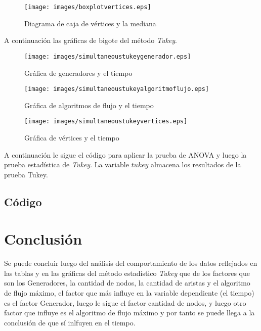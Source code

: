 \documentclass{article}
\begin{document}
\begin{figure}[H] 
    \centering
        \texttt{[image: images/boxplotvertices.eps]}
\caption{Diagrama de caja de vértices y la mediana}
\label{fig:seq1}
\end{figure}

A continuación las gráficas de bigote del método \textit{Tukey}.

\begin{figure}[H] 
    \centering
        \texttt{[image: images/simultaneoustukeygenerador.eps]}
\caption{Gráfica de generadores y el tiempo}
\label{fig:seq1}
\end{figure} 

\begin{figure}[H] 
    \centering
        \texttt{[image: images/simultaneoustukeyalgoritmoflujo.eps]}
\caption{Gráfica de algoritmos de flujo y el tiempo}
\label{fig:seq1}
\end{figure} 

\begin{figure}[H] 
    \centering
        \texttt{[image: images/simultaneoustukeyvertices.eps]}
\caption{Gráfica de vértices y el tiempo}
\label{fig:seq1}
\end{figure} 

A continuación le sigue el código para aplicar la prueba de ANOVA y luego la prueba estadística de \textit{Tukey}. La variable $tukey$ almacena los resultados de la prueba Tukey. 

\subsection{Código}



\section{Conclusión}

Se puede concluir luego del análisis del comportamiento de los datos reflejados en las tablas y en las gráficas del método estadístico \textit{Tukey} que de los factores que son los Generadores, la cantidad de nodos, la cantidad de aristas y el algoritmo de flujo máximo, el factor que más influye en la variable dependiente (el tiempo) es el factor Generador, luego le sigue el factor cantidad de nodos, y luego otro factor que influye es el algoritmo de flujo máximo y por tanto se puede llega a la conclusión de que sí inlfuyen en el tiempo.



\end{document}
